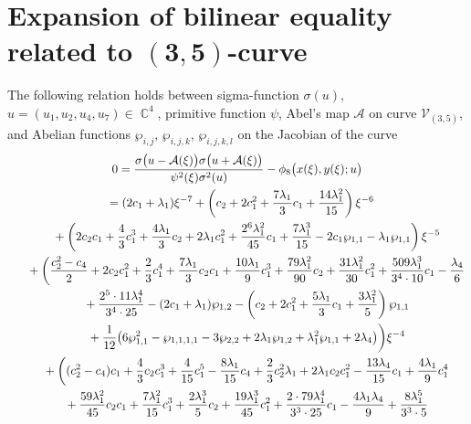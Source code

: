 \documentclass[pdftex]{sigma}
\numberwithin{equation}{section}
\DeclareMathOperator{\Complex}{\mathbb{C}}
\begin{document}
\section[Expansion of bilinear equality related to $(3,5)$-curve]{Expansion of bilinear equality related to $\boldsymbol{(3,5)}$-curve}\label{A:BLRs}
The following relation holds between sigma-function $\sigma(u)$, $u = (u_1,u_2,u_4,u_7)\in \Complex^4$, primitive function $\psi$, Abel's map $\mathcal{A}$ on curve $\mathcal{V}_{(3,5)}$, and Abelian functions $\wp_{i,j}$, $\wp_{i,j,k}$, $\wp_{i,j,k,l}$ on the Jacobian of the curve
\begin{gather*}
 0= \frac{\sigma\big(u-\mathcal{A}(\xi)\big)\sigma\big(u+\mathcal{A}(\xi)\big)} {\psi^2(\xi)\sigma^2(u)} - \phi_{8}\big(x(\xi),y(\xi);u\big)\\
 \hphantom{0}{} = (2 c_1 + \lambda_1) \xi^{-7}
 + \left(c_2 + 2c_1^2 + \frac{7\lambda_1}{3} c_1 + \frac{14 \lambda_1^2}{15} \right)\xi^{-6} \\
\hphantom{0=}{}+ \left(2 c_2 c_1 + \frac{4}{3} c_1^3 + \frac{4 \lambda_1}{3}c_2 + 2 \lambda_1 c_1^2
 + \frac{2^{6} \lambda _1^2}{45} c_1 + \frac{7 \lambda _1^3}{15}
 - 2 c_1 \wp _{1,1} - \lambda _1 \wp _{1,1}\right) \xi^{-5}\\
 \hphantom{0=}{} + \left( \frac{c_2^2-c_4}{2} + 2 c_2 c_1^2 + \frac{2}{3} c_1^4 + \frac{7 \lambda_1}{3} c_2 c_1 + \frac{10 \lambda_1}{9} c_1^3 + \frac{79 \lambda_1^2}{90} c_2
 + \frac{31 \lambda_1^2}{30} c_1^2 + \frac{509 \lambda _1^3}{3^4 \cdot 10} c_1
 - \frac{\lambda_4}{6}\right.\\
\hphantom{0=}{} + \frac{2^{5} \cdot 11 \lambda_1^4}{3^4 \cdot 25} - (2 c_1 + \lambda_1) \wp_{1,2}
 - \left(c_2 + 2c_1^2 + \frac{5 \lambda_1}{3} c_1 + \frac{3 \lambda_1^2}{5} \right) \wp_{1,1}\\
\hphantom{0=}{}
 + \frac{1}{12} \big( 6 \wp_{1,1}^2 - \wp_{1,1,1,1} - 3\wp_{2,2} + 2 \lambda_1 \wp_{1,2}
 + \lambda_1^2 \wp_{1,1} + 2\lambda_4\big) \bigg) \xi^{-4} \\
\hphantom{0=}{} + \left((c_2^2 - c_4) c_1
 + \frac{4}{3} c_2 c_1^3 + \frac{4}{15} c_1^5 - \frac{8 \lambda _1}{15} c_4
 + \frac{2}{3} c_2^2 \lambda _1 + 2 \lambda_1 c_2 c_1^2 - \frac{13 \lambda_4}{15} c_1
 + \frac{4 \lambda_1}{9} c_1^4\right.\\
\hphantom{0=}{}
+ \frac{59 \lambda _1^2}{45} c_2 c_1 + \frac{7 \lambda_1^2}{15} c_1^3 + \frac{2\lambda _1^3}{5} c_2
 + \frac{19 \lambda _1^3}{45} c_1^2 + \frac{2 \cdot 79 \lambda _1^4}{3^3 \cdot 25} c_1
 - \frac{4 \lambda _1 \lambda _4}{9} + \frac{8 \lambda_1^5}{3^3\cdot 5}\\

\end{gather*}
\end{document}
